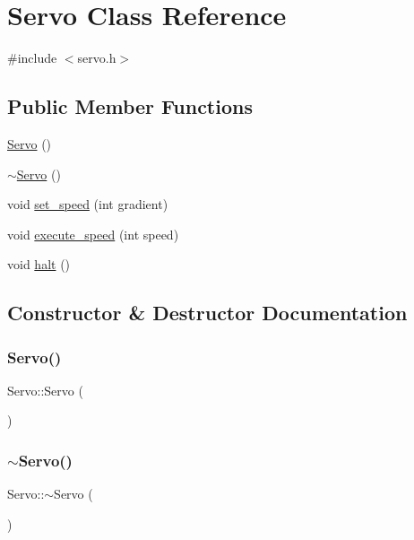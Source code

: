 \hypertarget{class_servo}{}\section{Servo Class Reference}
\label{class_servo}


{\ttfamily \#include $<$servo.\+h$>$}

\subsection*{Public Member Functions}
\begin{DoxyCompactItemize}
\item 
\mbox{\hyperlink{class_servo_a70b2b17657cf258cdcb57503bcf62cd2}{Servo}} ()
\item 
\mbox{\hyperlink{class_servo_acb51bf4d970b071741ba76349a431fb0}{$\sim$\+Servo}} ()
\item 
void \mbox{\hyperlink{class_servo_aecca91f485fc36404ce8cdfcb95f0527}{set\+\_\+speed}} (int gradient)
\item 
void \mbox{\hyperlink{class_servo_af6eeaa06f8e1d8ce24015d057be7dc20}{execute\+\_\+speed}} (int speed)
\item 
void \mbox{\hyperlink{class_servo_a2219362602b79927b5fbd6343799f217}{halt}} ()
\end{DoxyCompactItemize}


\subsection{Constructor \& Destructor Documentation}
\mbox{\label{class_servo_a70b2b17657cf258cdcb57503bcf62cd2}} 
\subsubsection{\texorpdfstring{Servo()}{Servo()}}
{\footnotesize\ttfamily Servo\+::\+Servo (\begin{DoxyParamCaption}{ }\end{DoxyParamCaption})}

\mbox{\label{class_servo_acb51bf4d970b071741ba76349a431fb0}} 
\subsubsection{\texorpdfstring{$\sim$\+Servo()}{~Servo()}}
{\footnotesize\ttfamily Servo\+::$\sim$\+Servo (\begin{DoxyParamCaption}{ }\end{DoxyParamCaption})}



